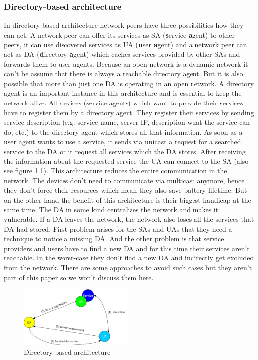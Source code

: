 \subsubsection{Directory-based architecture}
In directory-based architecture network peers have three possibilities how they can act. A network peer can offer its services as SA (\textbf{s}ervice \textbf{a}gent) to other peers, it can use discovered services as UA (\textbf{u}ser \textbf{a}gent) and a network peer can act as DA (\textbf{d}irectory \textbf{a}gent) which caches services provided by other SAs and forwards them to user agents. Because an open network is a dynamic network it can't be assume that there is always a reachable directory agent. But it is also possible that more than just one DA is operating in an open network. A directory agent is an important instance in this architecture and is essential to keep the network alive. All devices (service agents) which want to provide their services have to register them by a directory agent.
They register their services by sending service description (e.g. service name, server IP, description what the service can do, etc.) to the directory agent which stores all that information. As soon as a user agent wants to use a service, it sends via unicast a request for a searched service to the DA or it request all services which the DA stores. After receiving the information about the requested service the UA can connect to the SA (also see figure 1.1). This architecture reduces the entire communication in the network. The devices don't need to communicate via multicast anymore, hence they don't force their resources which mean they also save battery lifetime. But on the other hand the benefit of this architecture is their biggest handicap at the same time. The DA in some kind centralizes the network and makes it vulnerable. If a DA leaves the network, the network also loses all the services that DA had stored. First problem arises for the SAs and UAs that they need a technique to notice a missing DA. And the other problem is that service providers and users have to find a new DA and for this time their services aren't reachable. In the worst-case they don't find a new DA and indirectly get excluded from the network. There are some approaches to avoid such cases but they aren't part of this paper so we won't discuss them here.

\begin{figure}[h]
\centering\includegraphics[width=0.5\textwidth]{Images/directory-based_architecture}
\caption{Directory-based architecture}
\end{figure}\noindent

